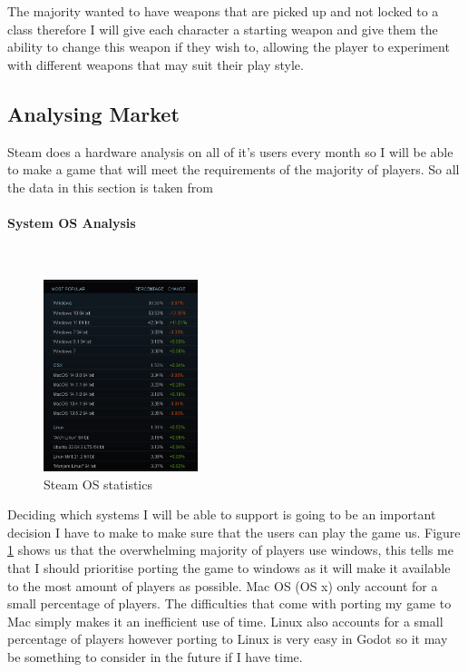 \documentclass{article}
\newcommand{\parBr}{\vspace{5mm}}%
\newcommand{\myparagraph}[1]{\paragraph{#1}\mbox{}\\} %
\begin{document}
\parBr

The majority wanted to have weapons that are picked up and not locked to a class therefore I will give each character a starting weapon and give them the ability to change this weapon if they wish to, allowing the player to experiment with different weapons that may suit their play style.

\subsection{Analysing Market}
Steam does a hardware analysis on all of it's users every month so I will be able to make a game that will meet the requirements of the majority of players. So all the data in this section is taken from \cite{SHS}

\myparagraph{System OS Analysis}

\begin{figure}[h]
\centering
\includegraphics[width = 0.4\textwidth]{steamOSsurvey}
\caption{\cite{SHS} Steam OS statistics}
\label{steam OS statistics}
\end{figure}

Deciding which systems I will be able to support is going to be an important decision I have to make to make sure that the users can play the game us. Figure \ref{steam OS statistics} shows us that the overwhelming majority of players use windows, this tells me that I should prioritise porting the game to windows as it will make it available to the most amount of players as possible. Mac OS (OS x) only account for a small percentage of players. The difficulties that come with porting my game to Mac simply makes it an inefficient use of time. Linux also accounts for a small percentage of players however porting to Linux is very easy in Godot so it may be something to consider in the future if I have time.

\parBr
\parBr
\end{document}
